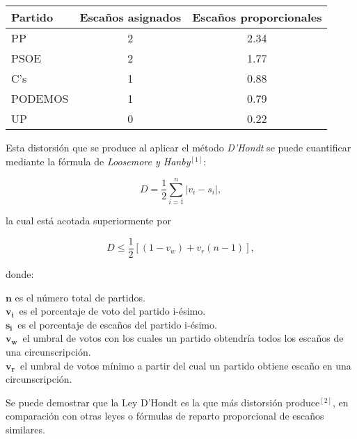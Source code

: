 \documentclass[11pt]{article}
\newcommand\console[1]{{\inconsolata #1}}
\begin{document}
	 \medskip
	 
	 \console{
	 
	 \begin{center}
	 \begin{tabular}{l|c|c}
	 \textbf{Partido} & \textbf{Escaños asignados} & \textbf{Escaños proporcionales}\\
	 \hline
	 PP & 2 & 2.34\\
	 PSOE & 2 & 1.77\\
	 C's & 1 & 0.88\\
	 PODEMOS & 1 & 0.79\\
	 UP & 0 & 0.22 \\
	 \end{tabular}
	 \end{center}
	 }
	 
	 \medskip
	 
	 Esta distorsión que se produce al aplicar el método \textit{D'Hondt} se puede cuantificar mediante la fórmula de \textit{Loosemore y Hanby}$^{[1]}$:
	 
	 \vspace{-0.5em}
	 $$D = \frac{1}{2} \sum_{i=1}^n |v_i - s_i|,$$
	 
	 \vspace{-0.5em}
	 la cual está acotada superiormente por
	 
	 \vspace{-0.5em}
	 $$D \le \frac{1}{2} \left[ (1 - v_w) + v_r(n-1) \right],$$
	 
	 \vspace{-0.5em}
	 donde:
	 
	 \enlargethispage{2\baselineskip}
	 
	  $\boldsymbol{n}$ es el número total de partidos.\\
  $\displaystyle \boldsymbol{v_{i}}\,$  es el porcentaje de voto del partido i-ésimo.\\
  $\displaystyle \boldsymbol{s_{i}}\,$  es el porcentaje de escaños del partido i-ésimo.\\
  $\displaystyle \boldsymbol{v_{w}}\,$  el umbral de votos con los cuales un partido obtendría todos los escaños de una circunscripción.\\
  $\displaystyle \boldsymbol{v_{r}}\,$  el umbral de votos mínimo a partir del cual un partido obtiene escaño en una circunscripción.
	 
	 Se puede demostrar que la Ley D'Hondt es la que más distorsión produce$^{[2]}$, en comparación con otras leyes o fórmulas de reparto proporcional de escaños similares.
	 
\end{document}
